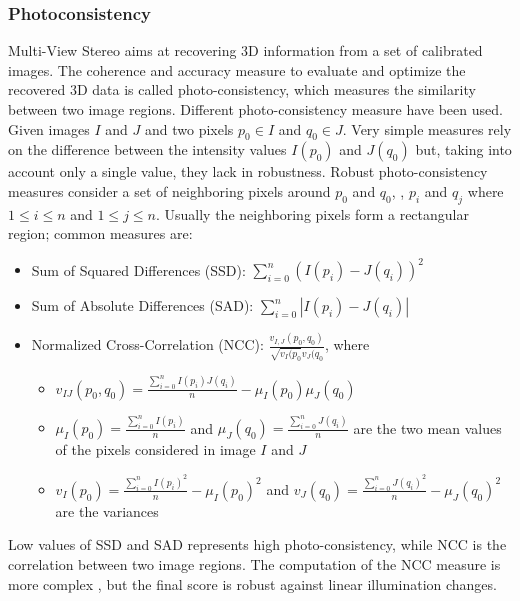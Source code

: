 \subsubsection{Photoconsistency}
Multi-View Stereo aims at recovering 3D information from a set of calibrated images. The coherence and accuracy measure to evaluate and optimize the recovered 3D data is called photo-consistency, which measures the similarity between two image regions.
Different photo-consistency measure have been used. 
Given images $I$ and $J$ and two pixels $p_0\in I$ and $q_0\in J$. Very simple measures rely on the difference between the intensity values  $I(p_0)$ and $J(q_0)$ but, taking into account only a single value, they lack in robustness. 
Robust photo-consistency measures consider a set of neighboring  pixels around $p_0$ and $q_0$, \ie, $p_i$ and $q_j$ where $1\leq i \leq n$ and $1\leq j \leq n$. Usually the neighboring pixels form a rectangular region; common measures are:
\begin{itemize}
  \item Sum of Squared Differences (SSD): $\sum_{i=0}^{n}(I(p_i) - J(q_i))^2$
  \item Sum of Absolute Differences (SAD): $\sum_{i=0}^{n}|I(p_i) - J(q_i)|$
  \item Normalized Cross-Correlation (NCC): $\frac{v_{I,J}(p_0,q_0)}{\sqrt{v_{I}(p_0} v_{J}(q_0}$,
  where 
  \begin{itemize}
    \item $v_{IJ}(p_0,q_0) = \frac{\sum_{i=0}^{n}I(p_i)J(q_i)}{n} - \mu_I(p_0) \mu_{J}(q_0)$
    \item $\mu_{I}(p_0) = \frac{\sum_{i=0}^{n}I(p_i)}{n}$ and $\mu_{J}(q_0) = \frac{\sum_{i=0}^{n}J(q_i)}{n}$ are the two mean values of the pixels considered in image $I$ and $J$
    \item $v_{I}(p_0) = \frac{\sum_{i=0}^{n}I(p_i)^2}{n} - \mu_I(p_0)^2$ and $v_{J}(q_0) = \frac{\sum_{i=0}^{n}J(q_i)^2}{n} - \mu_{J}(q_0)^2$ are the variances
  \end{itemize}
\end{itemize}
Low values of SSD and SAD represents high photo-consistency, while NCC is the correlation between two image regions. 
The computation of the NCC measure is more complex , but the final score is robust against linear illumination changes.


